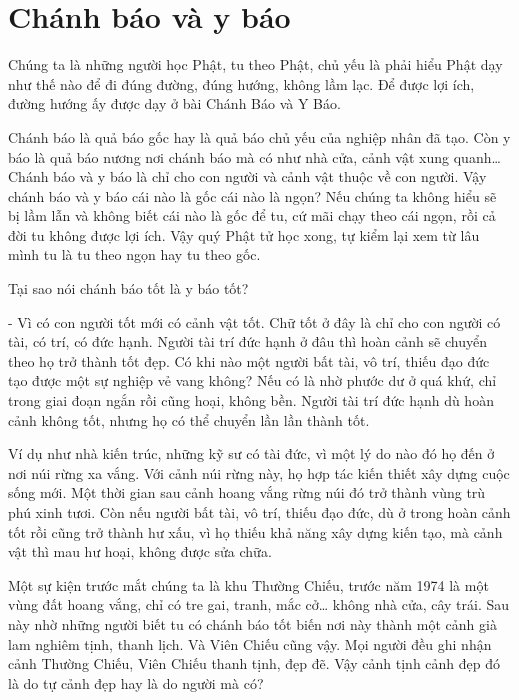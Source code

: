 \documentclass[
  12pt,
  oneside]{book}
\begin{document}
\hypertarget{chanh-bao-va-y-bao}{%
\chapter*{Chánh báo và y báo}\label{chanh-bao-va-y-bao}}

Chúng ta là những người học Phật, tu theo Phật, chủ yếu là phải hiểu Phật dạy như thế nào để đi đúng đường, đúng hướng, không lầm lạc. Để được lợi ích, đường hướng ấy được dạy ở bài Chánh Báo và Y Báo.

Chánh báo là quả báo gốc hay là quả báo chủ yếu của nghiệp nhân đã tạo. Còn y báo là quả báo nương nơi chánh báo mà có như nhà cửa, cảnh vật xung quanh\ldots{} Chánh báo và y báo là chỉ cho con người và cảnh vật thuộc về con người. Vậy chánh báo và y báo cái nào là gốc cái nào là ngọn? Nếu chúng ta không hiểu sẽ bị lầm lẫn và không biết cái nào là gốc để tu, cứ mãi chạy theo cái ngọn, rồi cả đời tu không được lợi ích. Vậy quý Phật tử học xong, tự kiểm lại xem từ lâu mình tu là tu theo ngọn hay tu theo gốc.

Tại sao nói chánh báo tốt là y báo tốt?

- Vì có con người tốt mới có cảnh vật tốt. Chữ tốt ở đây là chỉ cho con người có tài, có trí, có đức hạnh. Người tài trí đức hạnh ở đâu thì hoàn cảnh sẽ chuyển theo họ trở thành tốt đẹp. Có khi nào một người bất tài, vô trí, thiếu đạo đức tạo được một sự nghiệp vẻ vang không? Nếu có là nhờ phước dư ở quá khứ, chỉ trong giai đoạn ngắn rồi cũng hoại, không bền. Người tài trí đức hạnh dù hoàn cảnh không tốt, nhưng họ có thể chuyển lần lần thành tốt.

Ví dụ như nhà kiến trúc, những kỹ sư có tài đức, vì một lý do nào đó họ đến ở nơi núi rừng xa vắng. Với cảnh núi rừng này, họ hợp tác kiến thiết xây dựng cuộc sống mới. Một thời gian sau cảnh hoang vắng rừng núi đó trở thành vùng trù phú xinh tươi. Còn nếu người bất tài, vô trí, thiếu đạo đức, dù ở trong hoàn cảnh tốt rồi cũng trở thành hư xấu, vì họ thiếu khả năng xây dựng kiến tạo, mà cảnh vật thì mau hư hoại, không được sửa chữa.

Một sự kiện trước mắt chúng ta là khu Thường Chiếu, trước năm 1974 là một vùng đất hoang vắng, chỉ có tre gai, tranh, mắc cở\ldots{} không nhà cửa, cây trái. Sau này nhờ những người biết tu có chánh báo tốt biến nơi này thành một cảnh già lam nghiêm tịnh, thanh lịch. Và Viên Chiếu cũng vậy. Mọi người đều ghi nhận cảnh Thường Chiếu, Viên Chiếu thanh tịnh, đẹp đẽ. Vậy cảnh tịnh cảnh đẹp đó là do tự cảnh đẹp hay là do người mà có?
\end{document}
